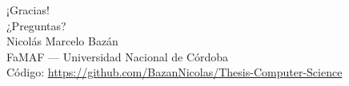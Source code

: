 \documentclass[aspectratio=169, 11pt]{beamer}
\begin{document}
\begin{frame}{}
  \vspace{2cm}
  \centering
  {\Huge \textcolor{uncblue}{¡Gracias!}}\\[1cm]
  {\Large ¿Preguntas?}\\[1.2cm]
  {\small
    Nicolás Marcelo Bazán\\
    FaMAF --- Universidad Nacional de Córdoba\\[0.35cm]
    Código: \url{https://github.com/BazanNicolas/Thesis-Computer-Science}
  }
\end{frame}
\end{document}
